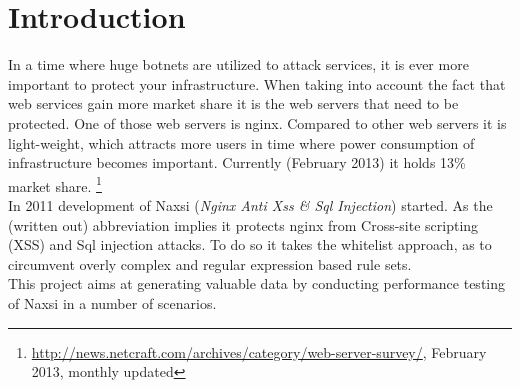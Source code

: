 \documentclass[Introduction]{subfiles}
\begin{document}
\section{Introduction}
\label{sec:Introduction}
In a time where huge botnets are utilized to attack services, it is ever more
important to protect your infrastructure. When taking into account the fact that
web services gain more market share it is the web servers that need to be
protected. One of those web servers is nginx. Compared to other web servers it is
light-weight, which attracts more users in time where power consumption of
infrastructure becomes important. Currently (February 2013) it holds 13\%
market share.
\footnote{\url{http://news.netcraft.com/archives/category/web-server-survey/},
February 2013, monthly updated}\\
In 2011 development of Naxsi (\emph{Nginx Anti Xss \& Sql Injection}) started. As the (written
out) abbreviation implies it protects nginx from Cross-site scripting (XSS) and Sql
injection attacks. To do so it takes the whitelist approach, as to circumvent overly
complex and regular expression based rule sets. \\
This project aims at generating valuable data by conducting performance testing
of Naxsi in a number of scenarios.
\end{document}
